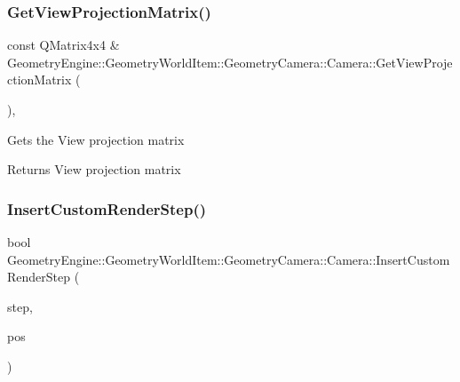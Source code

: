 \subsubsection{\texorpdfstring{GetViewProjectionMatrix()}{GetViewProjectionMatrix()}}
{\footnotesize\ttfamily const Q\+Matrix4x4 \& Geometry\+Engine\+::\+Geometry\+World\+Item\+::\+Geometry\+Camera\+::\+Camera\+::\+Get\+View\+Projection\+Matrix (\begin{DoxyParamCaption}{ }\end{DoxyParamCaption})\hspace{0.3cm}{\ttfamily [inline]}, {\ttfamily [virtual]}}

Gets the View projection matrix \begin{DoxyReturn}{Returns}
View projection matrix 
\end{DoxyReturn}
\mbox{\label{class_geometry_engine_1_1_geometry_world_item_1_1_geometry_camera_1_1_camera_aff83b52805cc8085af8f0802ab554c11}} 
\subsubsection{\texorpdfstring{InsertCustomRenderStep()}{InsertCustomRenderStep()}}
{\footnotesize\ttfamily bool Geometry\+Engine\+::\+Geometry\+World\+Item\+::\+Geometry\+Camera\+::\+Camera\+::\+Insert\+Custom\+Render\+Step (\begin{DoxyParamCaption}\item[{const \mbox{\hyperlink{class_geometry_engine_1_1_geometry_render_step_1_1_render_step}{Geometry\+Render\+Step\+::\+Render\+Step}} \&}]{step,  }\item[{unsigned int}]{pos }\end{DoxyParamCaption})\hspace{0.3cm}{\ttfamily [virtual]}}

